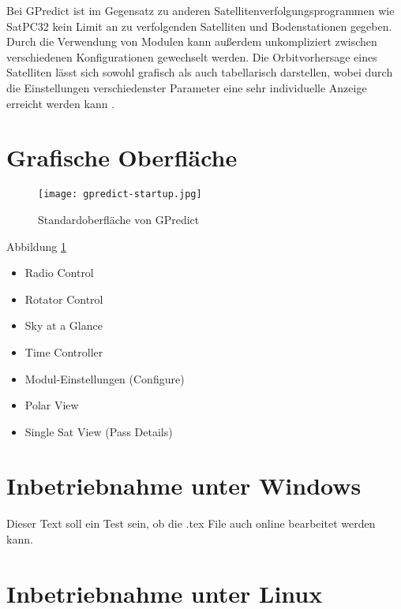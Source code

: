 \clearpage

Bei GPredict ist im Gegensatz zu anderen Satellitenverfolgungsprogrammen wie SatPC32 kein Limit an zu verfolgenden Satelliten und Bodenstationen gegeben. Durch die Verwendung von Modulen kann außerdem unkompliziert zwischen verschiedenen Konfigurationen gewechselt werden. Die Orbitvorhersage eines Satelliten lässt sich sowohl grafisch als auch tabellarisch darstellen, wobei durch die Einstellungen verschiedenster Parameter eine sehr individuelle Anzeige erreicht werden kann \cite{gpredictsource}.

\section{Grafische Oberfläche}

\begin{figure}[h]
	\centering
	\texttt{[image: gpredict-startup.jpg]}
	\caption{Standardoberfläche von GPredict}
	\label{fig:gpredictstartup} 
\end{figure}

\clearpage

Abbildung \ref{fig:gpredictstartup}

\begin{itemize}
	\parskip0pt
	\item Radio Control
	\item Rotator Control
	\item Sky at a Glance
	\item Time Controller
	\item Modul-Einstellungen (Configure)
	\item Polar View
	\item Single Sat View (Pass Details)
\end{itemize}

\clearpage

\section{Inbetriebnahme unter Windows}

Dieser Text soll ein Test sein, ob die .tex File auch online bearbeitet werden kann.

\section{Inbetriebnahme unter Linux}
